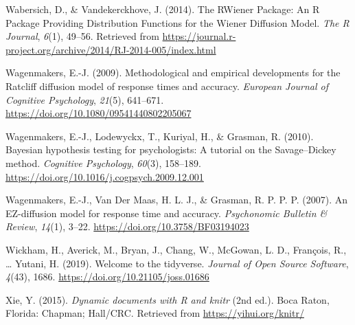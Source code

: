 \documentclass[
  11pt,
  english,
  ,doc,floatsintext]{apa6}
\begin{document}
\leavevmode\hypertarget{ref-wabersich_rwiener_2014}{}%
Wabersich, D., \& Vandekerckhove, J. (2014). The RWiener Package: An R Package Providing Distribution Functions for the Wiener Diffusion Model. \emph{The R Journal}, \emph{6}(1), 49--56. Retrieved from \url{https://journal.r-project.org/archive/2014/RJ-2014-005/index.html}

\leavevmode\hypertarget{ref-wagenmakers_methodological_2009-1}{}%
Wagenmakers, E.-J. (2009). Methodological and empirical developments for the Ratcliff diffusion model of response times and accuracy. \emph{European Journal of Cognitive Psychology}, \emph{21}(5), 641--671. \url{https://doi.org/10.1080/09541440802205067}

\leavevmode\hypertarget{ref-wagenmakers_bayesian_2010}{}%
Wagenmakers, E.-J., Lodewyckx, T., Kuriyal, H., \& Grasman, R. (2010). Bayesian hypothesis testing for psychologists: A tutorial on the Savage--Dickey method. \emph{Cognitive Psychology}, \emph{60}(3), 158--189. \url{https://doi.org/10.1016/j.cogpsych.2009.12.001}

\leavevmode\hypertarget{ref-wagenmakers_ez-diffusion_2007}{}%
Wagenmakers, E.-J., Van Der Maas, H. L. J., \& Grasman, R. P. P. P. (2007). An EZ-diffusion model for response time and accuracy. \emph{Psychonomic Bulletin \& Review}, \emph{14}(1), 3--22. \url{https://doi.org/10.3758/BF03194023}

\leavevmode\hypertarget{ref-R-tidyverse}{}%
Wickham, H., Averick, M., Bryan, J., Chang, W., McGowan, L. D., François, R., \ldots{} Yutani, H. (2019). Welcome to the tidyverse. \emph{Journal of Open Source Software}, \emph{4}(43), 1686. \url{https://doi.org/10.21105/joss.01686}

\leavevmode\hypertarget{ref-R-knitr}{}%
Xie, Y. (2015). \emph{Dynamic documents with R and knitr} (2nd ed.). Boca Raton, Florida: Chapman; Hall/CRC. Retrieved from \url{https://yihui.org/knitr/}
\end{document}
